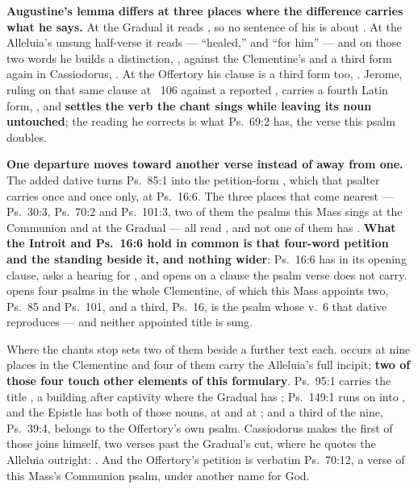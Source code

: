 \textbf{Augustine's lemma differs at three places where the difference carries
what he says.} At the Gradual it reads , so no sentence of
his is about . At the Alleluia's unsung half-verse it reads
 --- ``healed,'' and ``for him'' --- and on those
two words he builds a distinction, ,
against the Clementine's  and a third form again in
Cassiodorus, . At the Offertory his clause is a third form
too, . Jerome, ruling on that same clause at
~106 against a reported , carries a fourth Latin
form, , and \textbf{settles the verb the chant
sings while leaving its noun untouched}; the reading he corrects is what Ps.~69:2
has, the verse this psalm doubles.

\textbf{One departure moves toward another verse instead of away from one.} The
added dative turns Ps.~85:1 into the petition-form , which that psalter carries once and once only, at Ps.~16:6. The three
places that come nearest --- Ps.~30:3, Ps.~70:2 and Ps.~101:3, two of them the
psalms this Mass sings at the Communion and at the Gradual --- all read
, and not one of them has . \textbf{What the Introit and
Ps.~16:6 hold in common is that four-word petition and the 
standing beside it, and nothing wider}: Ps.~16:6 has  in its opening clause, asks a hearing
for , and opens on a clause the psalm verse does not carry. 
opens four psalms in the whole Clementine, of which this Mass appoints two,
Ps.~85 and Ps.~101, and a third, Ps.~16, is the psalm whose v.~6 that dative
reproduces --- and neither appointed title is sung.

Where the chants stop sets two of them beside a further text each.  occurs at nine places in the Clementine and four of them carry the
Alleluia's full incipit; \textbf{two of those four touch other elements of this
formulary}. Ps.~95:1 carries the title , a building after captivity where the Gradual has
; Ps.~149:1 runs on into , and the Epistle has both of those nouns, at
 and at ; and a
third of the nine, Ps.~39:4, belongs to the Offertory's own psalm. Cassiodorus makes the first
of those joins himself, two verses past the Gradual's cut, where he quotes the
Alleluia outright: . And the Offertory's
petition is verbatim Ps.~70:12, a verse of this Mass's Communion psalm, under
another name for God.

